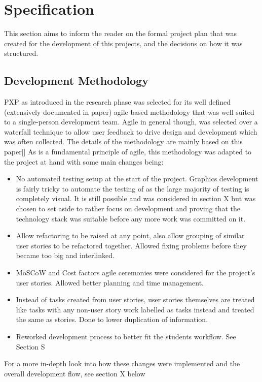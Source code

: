\section{Specification}
This section aims to inform the reader on the formal project plan that was created for the development of this projects, and the decisions on how it was structured.

\subsection{Development Methodology}
PXP as introduced in the research phase was selected for its well defined (extensively documented in paper) agile based methodology that was well suited to a single-person development team. Agile in general though, was selected over a waterfall technique to allow user feedback to drive design and development which was often collected. The details of the methodology are mainly based on this paper[]
As is a fundamental principle of agile, this methodology was adapted to the project at hand with some main changes being:
\begin{itemize}
    \item No automated testing setup at the start of the project. Graphics development is fairly tricky to automate the testing of as the large majority of testing is completely visual. It is still possible and was considered in section X but was chosen to set aside to rather focus on development and proving that the technology stack was suitable before any more work was committed on it.
    \item Allow refactoring to be raised at any point, also allow grouping of similar user stories to be refactored together. Allowed fixing problems before they became too big and interlinked.
    \item MoSCoW and Cost factors agile ceremonies were considered for the project’s user stories. Allowed better planning and time management.
    \item Instead of tasks created from user stories, user stories themselves are treated like tasks with any non-user story work labelled as tasks instead and treated the same as stories. Done to lower duplication of information.
    \item Reworked development process to better fit the students workflow. See Section S
\end{itemize}

For a more in-depth look into how these changes were implemented and the overall development flow, see section X below

